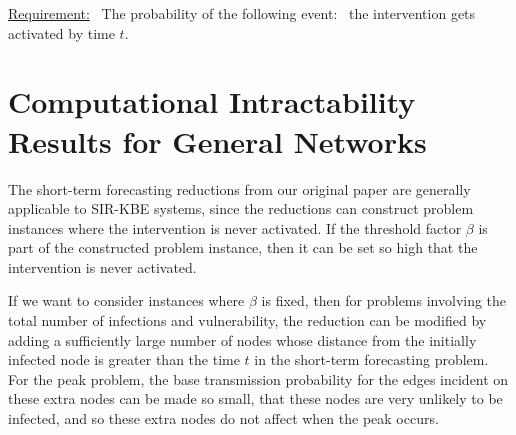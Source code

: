 \documentclass[11pt]{article}
\begin{document}
\smallskip
\noindent
\underline{Requirement:}~ The probability of the following
event:~ the intervention gets activated by time $t$.





\bigskip

\section{Computational Intractability Results for General Networks}
\label{sec:general_results}

The short-term forecasting reductions from our original paper 
are generally applicable to SIR-KBE systems,
since the reductions can construct problem instances where the intervention is never activated.
If the threshold factor $\beta$ is part of the constructed problem instance,
then it can be set so high that the intervention is never activated.

If we want to consider instances where $\beta$ is fixed,
then for problems involving the total number of infections and vulnerability,
the reduction can be modified by adding a sufficiently large number of nodes 
whose distance from the initially infected node is greater than the time $t$
in the short-term forecasting problem.
For the peak problem, 
the base transmission probability for the edges incident on these extra nodes can be made so small, 
that these nodes are very unlikely to be infected, 
and so these extra nodes do not affect when the peak occurs. 
\end{document}
